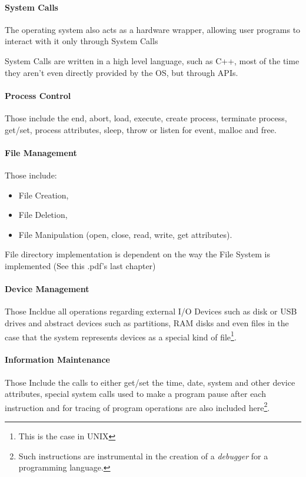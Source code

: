 \documentclass[openright, twoside]{report}
\theoremstyle{definition}
\theoremstyle{example}
\begin{document}
		\paragraph{System Calls}
			The operating system also acts as a hardware wrapper, allowing user programs 
			to interact with it only through System Calls 
			
			System Calls are written in a high level language, such as C++, most of the 
			time they aren't even directly provided by the OS, but through APIs.
			
			\paragraph{Process Control}
			Those include the end, abort, load, execute, create process, terminate process, 
			get/set, process attributes, sleep, throw or listen for event, malloc and free.

			\paragraph{File Management}
			Those include:
			\begin{itemize}
				\item File Creation,
				\item File Deletion,
				\item File Manipulation (open, close, read, write, get attributes).
			\end{itemize}

			File directory implementation is dependent on the way the File System is implemented 
			(See this .pdf's last chapter)

			\paragraph{Device Management}
			Those Incldue all operations regarding external I/O Devices such as disk or USB drives 
			and abstract devices such as partitions, RAM disks and even files in the case 
			that the system represents devices as a special kind of file\footnote{This is the 
			case in UNIX}.

			\paragraph{Information Maintenance}
			Those Include the calls to either get/set the time, date, system and 
			other device attributes, special system calls used to make a program 
			pause after each instruction and for tracing of program operations are 
			also included here\footnote{Such instructions are instrumental in the 
			creation of a \emph{debugger} for a programming language.}.
\end{document}
